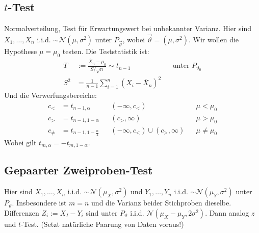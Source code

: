 \documentclass[8pt]{extarticle}
\newcommand{\vt}{\vartheta}
\newcommand{\Sn}{\sum_{i = 1}^n}
\newcommand{\zufallsvariablen}{X_1, \dots, X_n}
\newcommand{\Normalverteilt}{\mathcal{N}  (\mu, \sigma^2)}
\begin{document}
\begin{multicols*}{3}
  \subsection*{$t$-Test}
  Normalverteilung, Test für Erwartungswert bei unbekannter Varianz. Hier sind
  $\zufallsvariablen$ i.i.d. $\sim \Normalverteilt$ unter $P_{\vec{\vt}}$, wobei
  $\vec{\vt} =  (\mu, \sigma^2)$. Wir wollen die Hypothese $\mu = \mu_0$ testen.
  Die Teststatistik ist:
  \begin{align*}
    T   & := \frac{\overline{X}_n - \mu_0}{S / \sqrt{n}} \sim t_{n-1}
        &                                                             & \text{unter } P_{\vt_0} \\
    S^2 & = \frac{1}{n-1} \Sn  (X_i - \overline{X}_n)^2
  \end{align*}
  Und die Verwerfungsbereiche:
  \begin{align*}
    c_<      & = t_{n-1, \alpha}               &  &  (-\infty, c_<)                    &  & \mu < \mu_0    \\
    c_>      & = t_{n-1, 1 - \alpha}           &  &  (c_>, \infty)                     &  & \mu > \mu_0    \\
    c_{\neq} & = t_{n-1, 1 - \frac{\alpha}{2}} &  &  (-\infty, c_<) \cup  (c_>, \infty) &  & \mu \neq \mu_0
  \end{align*}
  Wobei gilt $t_{m, \alpha} = -t_{m, 1 - \alpha}$.
  \subsection*{Gepaarter Zweiproben-Test}
  Hier sind $\zufallsvariablen$ i.i.d. $\sim \mathcal{N} (\mu_X, \sigma^2)$ und
  $Y_1, \dots, Y_n$ i.i.d. $\sim \mathcal{N} (\mu_Y, \sigma^2)$ unter $P_\vt$.
  Insbesondere ist $m = n$ und die Varianz beider Stichproben dieselbe.
  Differenzen $Z_i := X_I - Y_i$ sind unter $P_\vt$ i.i.d. $\mathcal{N} (\mu_X -
    \mu_Y, 2 \sigma^2)$. Dann analog $z$ und $t$-Test.  (Setzt natürliche Paarung
  von Daten voraus!)

\end{multicols*}
\end{document}
